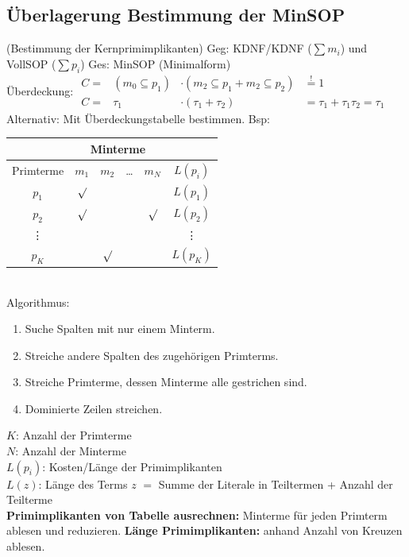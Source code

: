 \documentclass[6pt,a4paper]{scrartcl}
\renewcommand{\emph}[1]{\textsf{\textbf{#1}}}
\begin{document}
\begin{multicols*}{3}
	\subsection{Überlagerung Bestimmung der MinSOP}
  (Bestimmung der Kernprimimplikanten)
	Geg: KDNF/KDNF ($\sum m_i$) und VollSOP ($\sum p_i$) \qquad Ges: MinSOP (Minimalform)\\
	Überdeckung: $\begin{array}{rccl} C = & (m_0 \subseteq p_1) & \cdot (m_2 \subseteq p_1 + m_2 \subseteq p_2) & \stackrel{!}=1 \\ C = & \tau_1 & \cdot (\tau_1 + \tau_2) & = \tau_1 + \tau_1 \tau_2 = \tau_1 \end{array}$ \\
	Alternativ: Mit Überdeckungstabelle bestimmen. Bsp:\\
	\begin{tabular}{|c|c|c|c|c|c|}
		\hline
		          &      \multicolumn{4}{c|}{Minterme}  &      \\ \hline
		Primterme &  $m_1$  &  $m_2$  & \dots &  $m_N$  & $L(p_i)$   \\ \bottomrule[1pt]
		  $p_1$   & $\surd$ &         &       &         & $L(p_1)$   \\ \hline
		  $p_2$   & $\surd$ &         &       & $\surd$ & $L(p_2)$   \\ \hline
		 \vdots   &         &         &       &         &  \vdots    \\ \hline
		  $p_K$   &         & $\surd$ &       &         & $L(p_K)$   \\ \hline
	\end{tabular} \\
	Algorithmus:
	\begin{enumerate}
		\item Suche Spalten mit nur einem Minterm.
		\item Streiche andere Spalten des zugehörigen Primterms.
		\item Streiche Primterme, dessen Minterme alle gestrichen sind.
		\item Dominierte Zeilen streichen.
	\end{enumerate}
	$K$: Anzahl der Primterme\\
	$N$: Anzahl der Minterme \\
	$L(p_i)$: Kosten/Länge der Primimplikanten\\
  $L(z)$: Länge des Terms $z$ $=$ Summe der Literale in Teiltermen + Anzahl der Teilterme\\
\emph{Primimplikanten von Tabelle ausrechnen:} Minterme für jeden Primterm ablesen und reduzieren.
\emph{Länge Primimplikanten:} anhand Anzahl von Kreuzen ablesen.


\end{multicols*}
\end{document}
